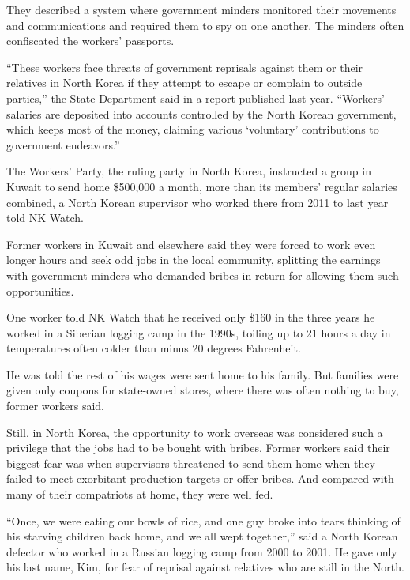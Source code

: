They described a system where government minders monitored their
movements and communications and required them to spy on one another.
The minders often confiscated the workers' passports.

``These workers face threats of government reprisals against them or
their relatives in North Korea if they attempt to escape or complain to
outside parties,'' the State Department said in
\href{http://www.state.gov/j/tip/rls/tiprpt/2014/?utm_source=NEW+RESOURCE:+Trafficking+in+Persons+R}{a
report} published last year. ``Workers' salaries are deposited into
accounts controlled by the North Korean government, which keeps most of
the money, claiming various `voluntary' contributions to government
endeavors.''

The Workers' Party, the ruling party in North Korea, instructed a group
in Kuwait to send home \$500,000 a month, more than its members' regular
salaries combined, a North Korean supervisor who worked there from 2011
to last year told NK Watch.

Former workers in Kuwait and elsewhere said they were forced to work
even longer hours and seek odd jobs in the local community, splitting
the earnings with government minders who demanded bribes in return for
allowing them such opportunities.

One worker told NK Watch that he received only \$160 in the three years
he worked in a Siberian logging camp in the 1990s, toiling up to 21
hours a day in temperatures often colder than minus 20 degrees
Fahrenheit.

He was told the rest of his wages were sent home to his family. But
families were given only coupons for state-owned stores, where there was
often nothing to buy, former workers said.

Still, in North Korea, the opportunity to work overseas was considered
such a privilege that the jobs had to be bought with bribes. Former
workers said their biggest fear was when supervisors threatened to send
them home when they failed to meet exorbitant production targets or
offer bribes. And compared with many of their compatriots at home, they
were well fed.

``Once, we were eating our bowls of rice, and one guy broke into tears
thinking of his starving children back home, and we all wept together,''
said a North Korean defector who worked in a Russian logging camp from
2000 to 2001. He gave only his last name, Kim, for fear of reprisal
against relatives who are still in the North.

